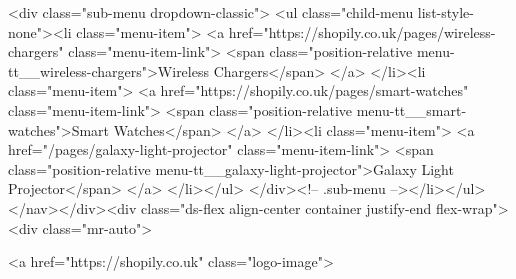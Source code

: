 {{{{{{{        <div class="sub-menu dropdown-classic">
          <ul class="child-menu list-style-none"><li class="menu-item">
                  <a href="https://shopily.co.uk/pages/wireless-chargers" class="menu-item-link">
                    <span class="position-relative menu-tt__wireless-chargers">Wireless Chargers</span>
                  </a>
                </li><li class="menu-item">
                  <a href="https://shopily.co.uk/pages/smart-watches" class="menu-item-link">
                    <span class="position-relative menu-tt__smart-watches">Smart Watches</span>
                  </a>
                </li><li class="menu-item">
                  <a href="/pages/galaxy-light-projector" class="menu-item-link">
                    <span class="position-relative menu-tt__galaxy-light-projector">Galaxy Light Projector</span>
                  </a>
                </li></ul>
        </div><!-- .sub-menu --></li></ul>
</nav></div><div class="ds-flex align-center container justify-end flex-wrap">
      <div class="mr-auto">
        

<a href="https://shopily.co.uk" class="logo-image">

}}}}}}}
